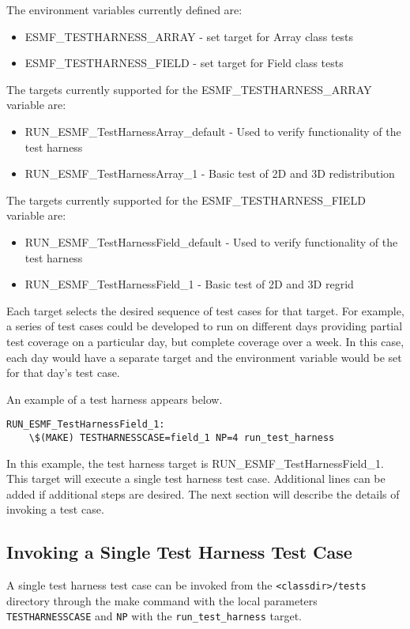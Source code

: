 The environment variables currently defined are:
\begin{itemize}
\item ESMF\_TESTHARNESS\_ARRAY - set target for Array class tests
\item ESMF\_TESTHARNESS\_FIELD - set target for Field class tests
\end{itemize}

The targets currently supported for the ESMF\_TESTHARNESS\_ARRAY variable are:
\begin{itemize}
\item RUN\_ESMF\_TestHarnessArray\_default - Used to verify functionality of the test harness
\item RUN\_ESMF\_TestHarnessArray\_1 - Basic test of 2D and 3D redistribution
\end{itemize}

The targets currently supported for the ESMF\_TESTHARNESS\_FIELD variable are:
\begin{itemize}
\item RUN\_ESMF\_TestHarnessField\_default - Used to verify functionality of the test harness
\item RUN\_ESMF\_TestHarnessField\_1 - Basic test of 2D and 3D regrid
\end{itemize}

Each target selects the desired sequence of test cases for that target.
For example, a series of test cases could be developed to run on different days providing partial
test coverage on a particular day, but complete coverage over a week.
In this case, each day would have a separate target and the environment variable would be set for
that day's test case.

An example of a test harness appears below.
\begin{verbatim}
RUN_ESMF_TestHarnessField_1:
	\$(MAKE) TESTHARNESSCASE=field_1 NP=4 run_test_harness
\end{verbatim}

In this example, the test harness target is RUN\_ESMF\_TestHarnessField\_1.  This target will execute a
single test harness test case. Additional lines can be added if additional steps are desired.
The next section will describe the details of invoking a test case.

\subsection{Invoking a Single Test Harness Test Case}
A single test harness test case can be invoked from the \texttt{<classdir>/tests}
directory through the make command with the local parameters \texttt{TESTHARNESSCASE} and
\texttt{NP} with the \texttt{run\_test\_harness} target.

